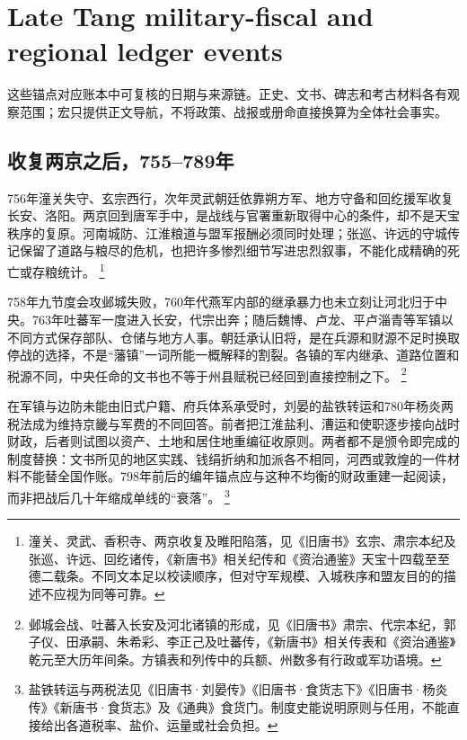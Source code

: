 \section{Late Tang military-fiscal and regional ledger events}
\label{sec:an-lushan-late-tang-event-anchors-batch-two}
这些锚点对应账本中可复核的日期与来源链。正史、文书、碑志和考古材料各有观察范围；宏只提供正文导航，不将政策、战报或册命直接换算为全体社会事实。

\subsection{收复两京之后，755--789年}

756年潼关失守、玄宗西行，次年灵武朝廷依靠朔方军、地方守备和回纥援军收复长安、洛阳。两京回到唐军手中，是战线与官署重新取得中心的条件，却不是天宝秩序的复原。河南城防、江淮粮道与盟军报酬必须同时处理；张巡、许远的守城传记保留了道路与粮尽的危机，也把许多惨烈细节写进忠烈叙事，不能化成精确的死亡或存粮统计。%
\footnote{潼关、灵武、香积寺、两京收复及睢阳陷落，见《旧唐书》玄宗、肃宗本纪及张巡、许远、回纥诸传，《新唐书》相关纪传和《资治通鉴》天宝十四载至至德二载条。不同文本足以校读顺序，但对守军规模、入城秩序和盟友目的的描述不应视为同等可靠。}

758年九节度会攻邺城失败，760年代燕军内部的继承暴力也未立刻让河北归于中央。763年吐蕃军一度进入长安，代宗出奔；随后魏博、卢龙、平卢淄青等军镇以不同方式保存部队、仓储与地方人事。朝廷承认旧将，是在兵源和财源不足时换取停战的选择，不是“藩镇”一词所能一概解释的割裂。各镇的军内继承、道路位置和税源不同，中央任命的文书也不等于州县赋税已经回到直接控制之下。%
\footnote{邺城会战、吐蕃入长安及河北诸镇的形成，见《旧唐书》肃宗、代宗本纪，郭子仪、田承嗣、朱希彩、李正己及吐蕃传，《新唐书》相关传表和《资治通鉴》乾元至大历年间条。方镇表和列传中的兵额、州数多有行政或军功语境。}

在军镇与边防未能由旧式户籍、府兵体系承受时，刘晏的盐铁转运和780年杨炎两税法成为维持京畿与军费的不同回答。前者把江淮盐利、漕运和使职逐步接向战时财政，后者则试图以资产、土地和居住地重编征收原则。两者都不是颁令即完成的制度替换：文书所见的地区实践、钱绢折纳和加派各不相同，河西或敦煌的一件材料不能替全国作账。798年前后的编年锚点应与这种不均衡的财政重建一起阅读，而非把战后几十年缩成单线的“衰落”。%
\footnote{盐铁转运与两税法见《旧唐书·刘晏传》《旧唐书·食货志下》《旧唐书·杨炎传》《新唐书·食货志》及《通典》食货门。制度史能说明原则与任用，不能直接给出各道税率、盐价、运量或社会负担。}

